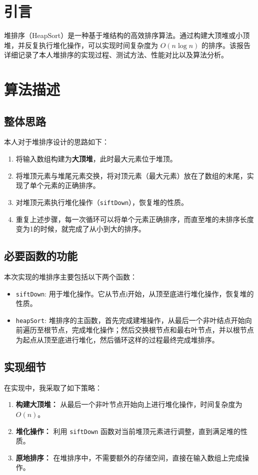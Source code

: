 \documentclass[UTF8]{ctexart}
\begin{document}
\section{引言}
堆排序（HeapSort）是一种基于堆结构的高效排序算法。通过构建大顶堆或小顶堆，并反复执行堆化操作，可以实现时间复杂度为 $O(n \log n)$ 的排序。该报告详细记录了本人堆排序的实现过程、测试方法、性能对比以及算法分析。

\section{算法描述}
\subsection{整体思路}
本人对于堆排序设计的思路如下：
\begin{enumerate}
    \item 将输入数组构建为\textbf{大顶堆}，此时最大元素位于堆顶。
    \item 将堆顶元素与堆尾元素交换，将对顶元素（最大元素）放在了数组的末尾，实现了单个元素的正确排序。
    \item 对堆顶元素执行堆化操作（\texttt{siftDown}），恢复堆的性质。
    \item 重复上述步骤，每一次循环可以将单个元素正确排序，而直至堆的未排序长度变为1的时候，就完成了从小到大的排序。
\end{enumerate}

\subsection{必要函数的功能}
本次实现的堆排序主要包括以下两个函数：
\begin{itemize}
    \item \texttt{siftDown}: 用于堆化操作。它从节点i开始，从顶至底进行堆化操作，恢复堆的性质。
    \item \texttt{heapSort}: 堆排序的主函数，首先完成建堆操作，从最后一个非叶结点开始向前遍历至根节点，完成堆化操作；然后交换根节点和最右叶节点，并以根节点为起点从顶至底进行堆化，然后循环这样的过程最终完成堆排序。
\end{itemize}

\subsection{实现细节}
在实现中，我采取了如下策略：
\begin{enumerate}
    \item \textbf{构建大顶堆：} 从最后一个非叶节点开始向上进行堆化操作，时间复杂度为 $O(n)$。
    \item \textbf{堆化操作：} 利用 \texttt{siftDown} 函数对当前堆顶元素进行调整，直到满足堆的性质。
    \item \textbf{原地排序：} 在堆排序中，不需要额外的存储空间，直接在输入数组上完成操作。
\end{enumerate}
\end{document}
